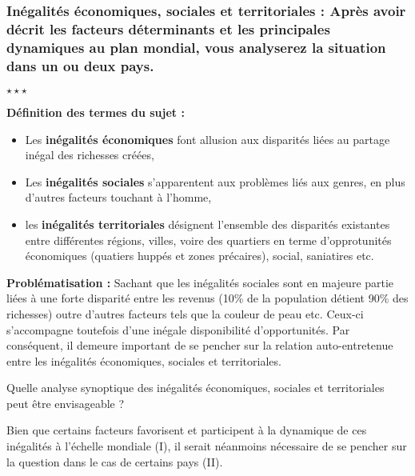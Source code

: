 \newpage \begin{center}
	\subsubsection*{Inégalités économiques, sociales et territoriales : Après avoir décrit les facteurs déterminants et les principales dynamiques au plan mondial, vous analyserez la situation dans un ou deux pays.}
	$\star \star \star$
\end{center}

\noindent \textbf{Définition des termes du sujet :}

\begin{itemize}
	\item Les \textbf{inégalités économiques} font allusion aux disparités liées au partage inégal des richesses créées,
	\item Les \textbf{inégalités sociales} s'apparentent aux problèmes liés aux genres, en plus d'autres facteurs touchant à l'homme,
	\item les \textbf{inégalités territoriales} désignent l'ensemble des disparités existantes entre différentes régions, villes, voire des quartiers en terme d'opprotunités économiques (quatiers huppés et zones précaires), social, saniatires etc.
\end{itemize}

\noindent\textbf{Problématisation :} Sachant que les inégalités sociales sont en majeure partie liées à une forte disparité entre les revenus (10\% de la population détient 90\% des richesses) outre d'autres facteurs tels que la couleur de peau etc. Ceux-ci s'accompagne toutefois d'une inégale disponibilité d'opportunités. Par conséquent, il demeure important de se pencher sur la relation auto-entretenue entre les inégalités économiques, sociales et territoriales.

Quelle analyse synoptique des inégalités économiques, sociales et territoriales peut être envisageable ? \newline

Bien que certains facteurs favorisent et participent à la dynamique de ces inégalités à l'échelle mondiale (I), il serait néanmoins nécessaire de se pencher sur la question dans le cas de certains pays (II).
